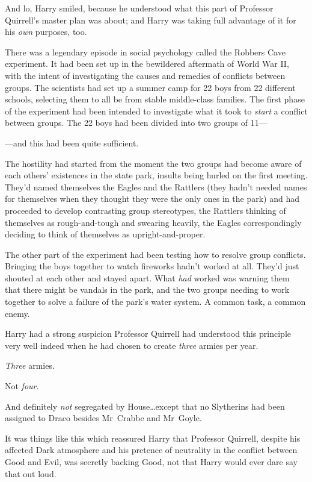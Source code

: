 And lo, Harry smiled, because he understood what this part of Professor Quirrell’s master plan was about; and Harry was taking full advantage of it for his \emph{own} purposes, too.

There was a legendary episode in social psychology called the Robbers Cave experiment. It had been set up in the bewildered aftermath of World War II, with the intent of investigating the causes and remedies of conflicts between groups. The scientists had set up a summer camp for 22 boys from 22 different schools, selecting them to all be from stable middle-class families. The first phase of the experiment had been intended to investigate what it took to \emph{start} a conflict between groups. The 22 boys had been divided into two groups of 11—

—and this had been quite sufficient.

The hostility had started from the moment the two groups had become aware of each others’ existences in the state park, insults being hurled on the first meeting. They’d named themselves the Eagles and the Rattlers (they hadn’t needed names for themselves when they thought they were the only ones in the park) and had proceeded to develop contrasting group stereotypes, the Rattlers thinking of themselves as rough-and-tough and swearing heavily, the Eagles correspondingly deciding to think of themselves as upright-and-proper.

The other part of the experiment had been testing how to resolve group conflicts. Bringing the boys together to watch fireworks hadn’t worked at all. They’d just shouted at each other and stayed apart. What \emph{had} worked was warning them that there might be vandals in the park, and the two groups needing to work together to solve a failure of the park’s water system. A common task, a common enemy.

Harry had a strong suspicion Professor Quirrell had understood this principle very well indeed when he had chosen to create \emph{three} armies per year.

\emph{Three} armies.

Not \emph{four}.

And definitely \emph{not} segregated by House…except that no Slytherins had been assigned to Draco besides Mr~Crabbe and Mr~Goyle.

It was things like this which reassured Harry that Professor Quirrell, despite his affected Dark atmosphere and his pretence of neutrality in the conflict between Good and Evil, was secretly backing Good, not that Harry would ever dare say that out loud.

